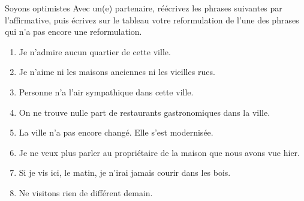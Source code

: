 \begin{frame}{Soyons optimistes}
  Avec un(e) partenaire, réécrivez les phrases suivantes par l'affirmative, puis \alert{écrivez sur le tableau} votre reformulation de l'une des phrases qui n'a pas encore une reformulation.
  \begin{enumerate}
    \item Je n'admire aucun quartier de cette ville.
    \item Je n'aime ni les maisons anciennes ni les vieilles rues.
    \item Personne n'a l'air sympathique dans cette ville.
    \item On ne trouve nulle part de restaurants gastronomiques dans la ville.
    \item La ville n'a pas encore changé. Elle s'est modernisée.
    \item Je ne veux plus parler au propriétaire de la maison que nous avons vue hier.
    \item Si je vis ici, le matin, je n'irai jamais courir dans les bois.
    \item Ne visitons rien de différent demain.
  \end{enumerate}
\end{frame}